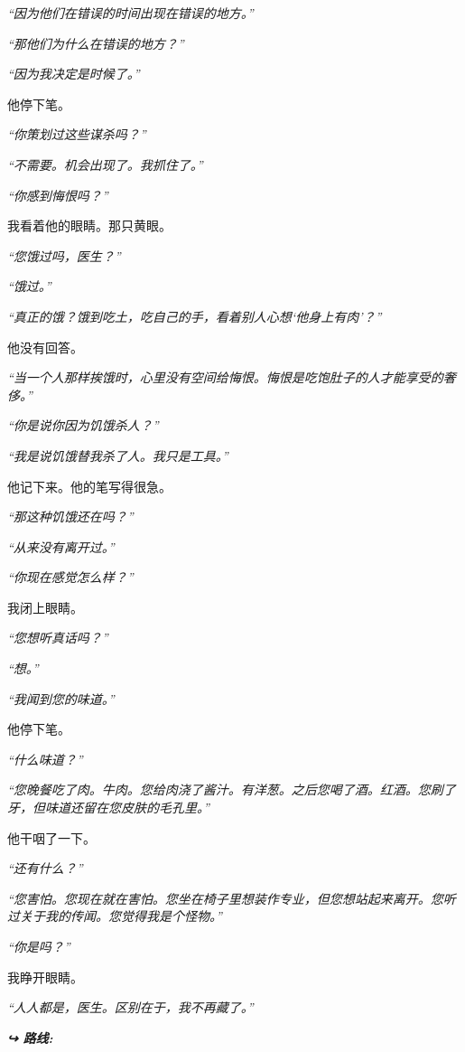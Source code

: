 \noindent \textit{“因为他们在错误的时间出现在错误的地方。”}

\noindent \textit{“那他们为什么在错误的地方？”}

\noindent \textit{“因为我决定是时候了。”}

\noindent 他停下笔。

\noindent \textit{“你策划过这些谋杀吗？”}

\noindent \textit{“不需要。机会出现了。我抓住了。”}

\noindent \textit{“你感到悔恨吗？”}

\noindent 我看着他的眼睛。那只黄眼。

\noindent \textit{“您饿过吗，医生？”}

\noindent \textit{“饿过。”}

\noindent \textit{“真正的饿？饿到吃土，吃自己的手，看着别人心想‘他身上有肉’？”}

\noindent 他没有回答。

\noindent \textit{“当一个人那样挨饿时，心里没有空间给悔恨。悔恨是吃饱肚子的人才能享受的奢侈。”}

\noindent \textit{“你是说你因为饥饿杀人？”}

\noindent \textit{“我是说饥饿替我杀了人。我只是工具。”}

\noindent 他记下来。他的笔写得很急。

\noindent \textit{“那这种饥饿还在吗？”}

\noindent \textit{“从来没有离开过。”}

\noindent \textit{“你现在感觉怎么样？”}

\noindent 我闭上眼睛。

\noindent \textit{“您想听真话吗？”}

\noindent \textit{“想。”}

\noindent \textit{“我闻到您的味道。”}

\noindent 他停下笔。

\noindent \textit{“什么味道？”}

\noindent \textit{“您晚餐吃了肉。牛肉。您给肉浇了酱汁。有洋葱。之后您喝了酒。红酒。您刷了牙，但味道还留在您皮肤的毛孔里。”}

\noindent 他干咽了一下。

\noindent \textit{“还有什么？”}

\noindent \textit{“您害怕。您现在就在害怕。您坐在椅子里想装作专业，但您想站起来离开。您听过关于我的传闻。您觉得我是个怪物。”}

\noindent \textit{“你是吗？”}

\noindent 我睁开眼睛。

\noindent \textit{“人人都是，医生。区别在于，我不再藏了。”}

\vspace{0.5em}
\noindent\textit{\textbf{↪ 路线:}  \rotasep {} \rotasep {}}
